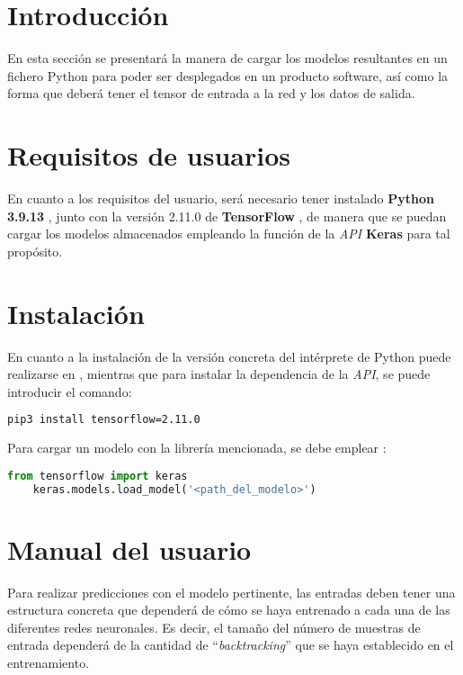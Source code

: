 
\section{Introducción}
En esta sección se presentará la manera de cargar los modelos resultantes en un fichero Python para poder ser desplegados en un producto software, 
así como la forma que deberá tener el tensor de entrada a la red y los datos de salida.

\section{Requisitos de usuarios}
En cuanto a los requisitos del usuario, será necesario tener instalado \textbf{Python 3.9.13} \cite{misc:python2023}, junto con la versión 2.11.0 de \textbf{TensorFlow} \cite{misc:tensorflow2023},
de manera que se puedan cargar los modelos almacenados empleando la función de la \textit{API} \textbf{Keras} para tal propósito.

\section{Instalación}
En cuanto a la instalación de la versión concreta del intérprete de Python puede realizarse en \cite{misc:python2023}, mientras que para instalar la dependencia de la \textit{API},
se puede introducir el comando:
\begin{lstlisting}[language=Bash]
    pip3 install tensorflow=2.11.0
\end{lstlisting}

Para cargar un modelo con la librería mencionada, se debe emplear \cite{misc:tensorflow_save2023}:
\begin{lstlisting}[language=Python]
    from tensorflow import keras
    keras.models.load_model('<path_del_modelo>')
\end{lstlisting}

\section{Manual del usuario}
Para realizar predicciones con el modelo pertinente, las entradas deben tener una estructura concreta que dependerá de cómo se haya entrenado a cada una de las diferentes redes neuronales.
Es decir, el tamaño del número de muestras de entrada dependerá de la cantidad de ``\textit{backtracking}'' que se haya establecido en el entrenamiento.


